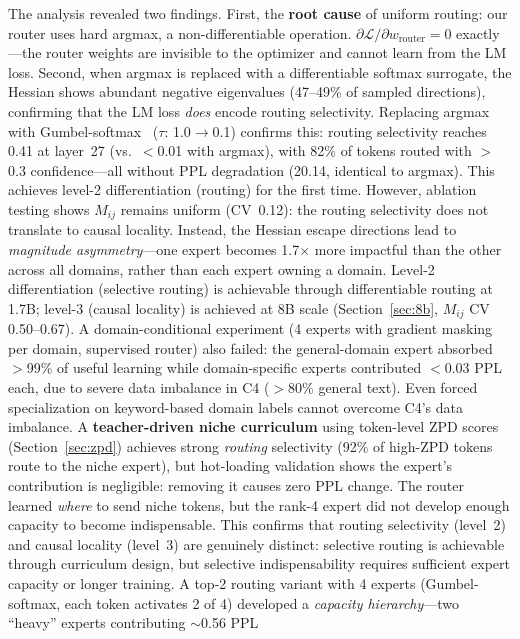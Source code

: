 \documentclass{article}
\begin{document}
The analysis revealed two findings. First, the \textbf{root cause} of uniform
routing: our router uses hard argmax, a non-differentiable operation.
$\partial\mathcal{L}/\partial w_{\text{router}} = 0$ exactly---the router
weights are invisible to the optimizer and cannot learn from the LM loss.
Second, when argmax is replaced with a differentiable softmax surrogate, the
Hessian shows abundant negative eigenvalues (47--49\% of sampled directions),
confirming that the LM loss \emph{does} encode routing selectivity. Replacing argmax with
Gumbel-softmax~\cite{jang2017gumbel} ($\tau$: 1.0$\to$0.1) confirms this:
routing selectivity reaches 0.41 at layer~27 (vs.\ $<$0.01 with argmax),
with 82\% of tokens routed with $>$0.3 confidence---all without PPL
degradation (20.14, identical to argmax). This achieves level-2
differentiation (routing) for the first time. However, ablation testing shows
$M_{ij}$ remains uniform (CV~0.12): the routing selectivity does not translate
to causal locality. Instead, the Hessian escape directions lead to
\emph{magnitude asymmetry}---one expert becomes 1.7$\times$ more impactful
than the other across all domains, rather than each expert owning a domain.
Level-2 differentiation (selective routing) is achievable through
differentiable routing at 1.7B; level-3 (causal locality) is achieved at
8B scale (Section~\ref{sec:8b}, $M_{ij}$ CV 0.50--0.67). A
domain-conditional experiment (4 experts with gradient masking per domain,
supervised router) also failed: the general-domain expert absorbed
$>$99\% of useful learning while domain-specific experts contributed
$<$0.03 PPL each, due to severe data imbalance in C4 ($>$80\% general text).
Even forced specialization on keyword-based domain labels cannot overcome
C4's data imbalance. A \textbf{teacher-driven niche curriculum}
using token-level ZPD scores (Section~\ref{sec:zpd}) achieves strong
\emph{routing} selectivity (92\% of high-ZPD tokens route to the niche
expert), but hot-loading validation shows the expert's contribution is
negligible: removing it causes zero PPL change. The router learned
\emph{where} to send niche tokens, but the rank-4 expert did not develop
enough capacity to become indispensable. This confirms that routing
selectivity (level~2) and causal locality (level~3) are genuinely
distinct: selective routing is achievable through curriculum design, but
selective indispensability requires sufficient expert capacity or longer
training. A top-2 routing variant
with 4 experts (Gumbel-softmax, each token activates 2 of 4) developed a
\emph{capacity hierarchy}---two ``heavy'' experts contributing $\sim$0.56 PPL
\end{document}
